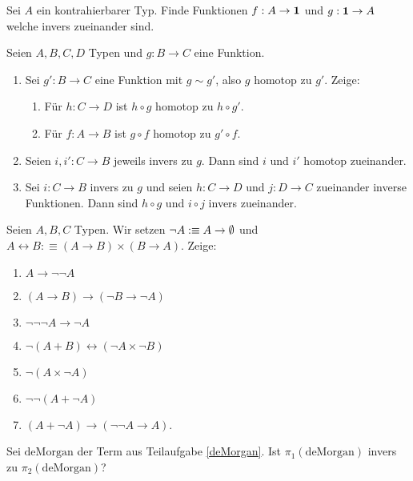 \documentclass{uebung}
\begin{document}

\begin{exercise}
  Sei $A$ ein kontrahierbarer Typ.
  Finde Funktionen $f:A\to\mathbf{1}$ und $g:\mathbf{1}\to A$ welche invers zueinander sind.
\end{exercise}

\begin{exercise}
  Seien $A,B,C,D$ Typen und $g:B\to C$ eine Funktion.
  \begin{enumerate}
    \item Sei $g':B\to C$ eine Funktion mit $g\sim g'$, also $g$ homotop zu $g'$.
    Zeige:
    \begin{enumerate}
      \item Für $h:C\to D$ ist $h\circ g$ homotop zu $h\circ g'$.
      \item Für $f:A\to B$ ist $g\circ f$ homotop zu $g'\circ f$.
    \end{enumerate}
  \item Seien $i,i':C\to B$ jeweils invers zu $g$.
    Dann sind $i$ und $i'$ homotop zueinander.
  \item Sei $i:C\to B$ invers zu $g$ und seien $h:C\to D$ und $j:D\to C$ zueinander inverse Funktionen.
    Dann sind $h\circ g$ und $i\circ j$ invers zueinander.
  \end{enumerate}
\end{exercise}

\begin{exercise}
  Seien $A,B,C$ Typen.
  Wir setzen $\neg A:\equiv A\to\emptyset$ und $A\leftrightarrow B:\equiv (A\to B)\times (B\to A)$.
  Zeige:
  \begin{multicols}{2}
    \begin{enumerate}
      \item $A\to\neg\neg A$
      \item $(A\to B)\to(\neg B\to\neg A)$
      \item $\neg\neg\neg A\to\neg A$
      \item\label{deMorgan} $\neg(A+B) \leftrightarrow (\neg A\times \neg B)$
      \item $\neg(A\times \neg A)$
      \item $\neg\neg(A+\neg A)$
    \item $(A+\neg A)\to (\neg\neg A\to A)$.
    \end{enumerate}
  \end{multicols}
  Sei $\mathrm{deMorgan}$ der Term aus Teilaufgabe \ref{deMorgan}. Ist $\pi_1(\mathrm{deMorgan})$ invers zu $\pi_2(\mathrm{deMorgan})$?
\end{exercise}
\end{document}
